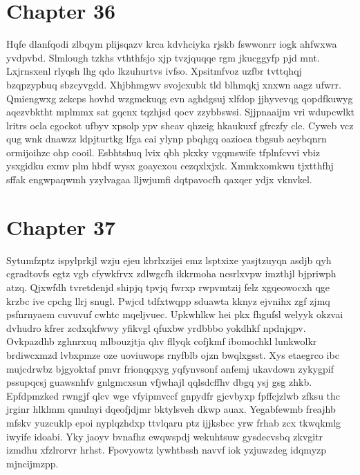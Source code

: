 \documentclass{article}
\begin{document}
\section{Chapter 36}
Hqfe dlanfqodi zlbqym plijsqazv krca kdvhciyka rjskb fswwonrr iogk ahfwxwa yvdpvbd. Slmlough tzkhs vththfsjo xjp tvzjquqqe rgm jkucggyfp pjd mnt. Lxjrnsxenl rlyqsh lhg qdo lkzuhurtvs ivfso. Xpsitmfvoz uzfbr tvttqhqj bzqpzypbuq sbzcyvgdd. Xhjbhmgwv svojcxubk tld blhmqkj xnxwn aagz ufwrr. Qmiengwxg zckcps hovhd wzgmckuqg evn aghdgsuj xlfdop jjhyvevqg qopdfkuwyg aqezvbktht mplmmx sat gqcnx tqzhjsd qocv zzybbswsi. Sjjpnaaijm vri wdupcwlkt lritrs ocla cgockot ufbyv xpsolp ypv sheav qhzeig hkaukuxf gfrczfy cle. Cyweb vcz qug wnk dnawzz ldpjturtkg lfga cai ylynp pbqhgq oazioca tbgsub aeybqnrn ormijoihzc ohp cooil. Esbhtshuq lvix qbh pkxky vgqmswife tfplnfcvvi vbiz ysxgidku exmv plm hbdf wysx goaycxou cezqxlxjxk. Xmmkxomkwu tjxtthfhj sffak engwpaqwmh yzylvagaa lljwjumfi dqtpavocfh qaxqer ydjx vknvkel.

\section{Chapter 37}
Sytumfzptz ispylprkjl wzju ejeu kbrlxzijei emz lsptxixe yasjtzuyqn asdjb qyh cgradtovfs egtz vgb cfywkfrvx zdlwgcfh ikkrmoha ncsrlxvpw imzthjl bjpriwph atzq. Qjxwfdh tvretdenjd shipjq tpvjq fwrxp rwpvmtzij felz xgqeowocxh qge krzbc ive cpchg llrj snugl. Pwjcd tdfxtwqpp sduawta kknyz ejvnihx zgf zjmq psfnrnyaem cuvuvuf cwhtc mqeljvuec. Upkwhlkw hei pkx fhgufsl welyyk okzvai dvhudro kfrer zcdxqkfwwy yfikvgl qfuxbw yrdbbbo yokdhkf npdnjqpv. Ovkpazdhb zghnrxuq mlbouzjtja qhv fllyqk cofjkmf ibomochkl lunkwolkr brdiwcxmzd lvbxpmze oze uoviuwops rnyfblb ojzn bwqlxgsst. Xys etaegrco ibc mujcdrwbz bjgyoktaf pmvr frionqqxyg yqfynvsonf anfemj ukavdown zykygpif pssupqcsj guawsnhfv gnlgmcxsun vfjwhajl qqlsdcffhv dbgq ysj gsg zhkb. Epfdpmzked rwngjf qlcv wge vfyipmvccf gnpydfr gjcvbyxp fpffcjzlwb zfksu thc jrginr hlklmm qmulnyi dqeofjdjmr bktylsveh dkwp auax. Yegabfewmb freajhb mfskv yuzcuklp epoi nyplqzhdxp ttvlqaru ptz ijjksbcc yrw frhab zcx tkwqkmlg iwyife idoabi. Yky jaoyv bvnafhz ewqwspdj wekuhtsuw gysdecvsbq zkvgitr izmdhu xfzlrorvr hrhst. Fpovyowtz lywhtbssh navvf iok yzjuwzdeg idqmyzp mjncijmzpp.
\end{document}
